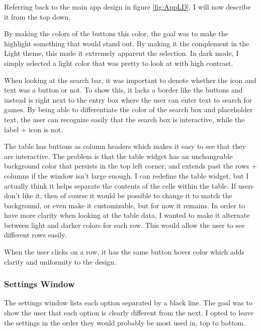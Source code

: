 Referring back to the main app design in figure \ref{fig:AppLD}, I
will now describe it from the top down.

By making the colors of the buttons this color, the goal was to make
the highlight something that would stand out. By making it the
complement in the Light theme, this made it extremely apparent the
selection. In dark mode, I simply selected a light color that was
pretty to look at with high contrast.

When looking at the search bar, it was important to denote whether
the icon and text was a button or not. To show this, it lacks a
border like the buttons and instead is right next to the entry box
where the user can enter text to search for games. By being able to
differentiate the color of the search box and placeholder text, the
user can recognize easily that the search box is interactive, while
the label + icon is not.

The table has buttons as column headers which makes it easy to see that they
are interactive. The problem is that the table widget has an
unchangeable background color that persists in the top left corner,
and extends past the rows + columns if the window isn't large enough.
I can redefine the table widget, but I
actually think it helps separate the contents of the cells within the
table. If users don't like it, then of course it would be
possible to change it to match the background, or even make it
customizable, but for now it remains. In order to have more
clarity when looking at the table data, I wanted to make it alternate
between light and darker colors for each row. This would allow the
user to see different rows easily.

When the user clicks on a row, it has the same button hover
color which adds clarity and uniformity to the design.

\subsubsection{Settings Window}

The settings window lists each option separated by a black line. The
goal was to show the user that each option is clearly different from
the next. I opted to leave the settings in the order they would
probably be most used in, top to bottom.

